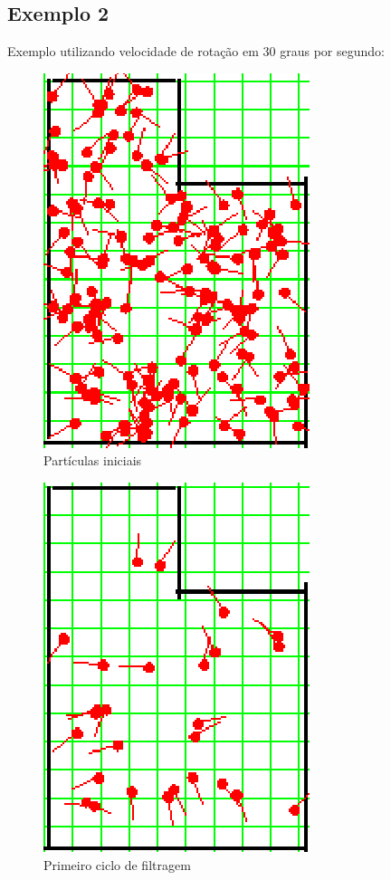 \subsection{Exemplo 2}

Exemplo utilizando velocidade de rotação em 30 graus por segundo:

\begin{figure}[H]
  \centering
  \includegraphics[scale=1]{figuras/cen2_ex2/1.eps}
  \caption[Partículas Iniciais]{Partículas iniciais}
  \label{img:cen2_ex2_1}
\end{figure}

\begin{figure}[H]
  \centering
  \includegraphics[scale=1]{figuras/cen2_ex2/2.eps}
  \caption[Primeiro Ciclo de Filtragem]{Primeiro ciclo de filtragem}
  \label{img:cen2_ex2_2}
\end{figure}


